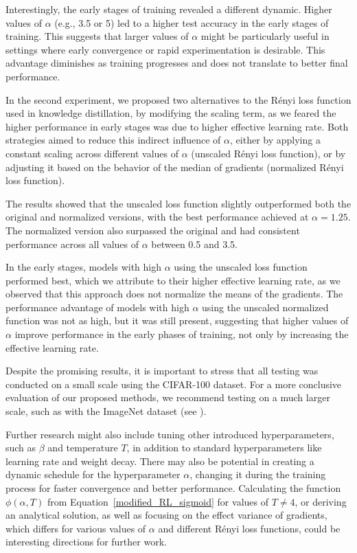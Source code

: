 Interestingly, the early stages of training revealed a different dynamic. Higher values of $\alpha$ (e.g., 3.5 or 5) led to a higher test accuracy in the early stages of training. This suggests that larger values of $\alpha$ might be particularly useful in settings where early convergence or rapid experimentation is desirable. This advantage diminishes as training progresses and does not translate to better final performance.

In the second experiment, we proposed two alternatives to the Rényi loss function used in knowledge distillation, by modifying the scaling term, as we feared the higher performance in early stages was due to higher effective learning rate. Both strategies aimed to reduce this indirect influence of $\alpha$, either by applying a constant scaling across different values of $\alpha$ (unscaled Rényi loss function), or by adjusting it based on the behavior of the median of gradients (normalized Rényi loss function).

The results showed that the unscaled loss function slightly outperformed both the original and normalized versions, with the best performance achieved at $\alpha = 1.25$. The normalized version also surpassed the original and had consistent performance across all values of $\alpha$ between 0.5 and 3.5.

In the early stages, models with high $\alpha$ using the unscaled loss function performed best, which we attribute to their higher effective learning rate, as we observed that this approach does not normalize the means of the gradients. The performance advantage of models with high $\alpha$ using the unscaled normalized function was not as high, but it was still present, suggesting that higher values of $\alpha$ improve performance in the early phases of training, not only by increasing the effective learning rate.

Despite the promising results, it is important to stress that all testing was conducted on a small scale using the CIFAR-100 dataset. For a more conclusive evaluation of our proposed methods, we recommend testing on a much larger scale, such as with the ImageNet dataset (see \cite{Deng2009}).

Further research might also include tuning other introduced hyperparameters, such as $\beta$ and temperature $T$, in addition to standard hyperparameters like learning rate and weight decay. There may also be potential in creating a dynamic schedule for the hyperparameter $\alpha$, changing it during the training process for faster convergence and better performance. Calculating the function $\phi(\alpha,T)$ from Equation~\ref{modified_RL_sigmoid} for values of $T \neq 4$, or deriving an analytical solution, as well as focusing on the effect variance of gradients, which differs for various values of $\alpha$ and different Rényi loss functions, could be interesting directions for further work.







